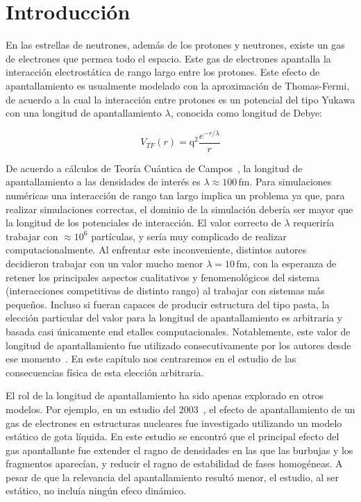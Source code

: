 \section{Introducción}

En las estrellas de neutrones, además de los protones y neutrones, existe un gas de electrones que permea todo el espacio.
Este gas de electrones apantalla la interacción electrostática de rango largo entre los protones.
Este efecto de apantallamiento es usualmente modelado con la aproximación de Thomas-Fermi, de acuerdo a la cual la interacción entre protones es un potencial del tipo Yukawa con una longitud de apantallamiento $\lambda$, conocida como longitud de Debye:

\begin{equation*}
 V_{TF}(r) = \text{q}^2\frac{e^{-r/\lambda}}{r}
\end{equation*}

De acuerdo a cálculos de Teoría Cuántica de Campos~\cite[pp. 175-180]{fetter_quantum_2003}, la longitud de apantallamiento a las densidades de interés es $\lambda\approx100\,\text{fm}$. 
Para simulaciones numéricas una interacción de rango tan largo implica un problema ya que, para realizar simulaciones correctas, el dominio de la simulación debería ser mayor que la longitud de los potenciales de interacción.
El valor correcto de $\lambda$ requeriría trabajar con $\approx 10^6$ partículas, y sería muy complicado de realizar computacionalmente.
Al enfrentar este inconveniente, distintos autores~\cite{maruyama_molecular_2012, horowitz_neutrino-pasta_2004} decidieron trabajar con un valor mucho menor $\lambda=10\,\text{fm}$, con la esperanza de retener los principales aspectos cualitativos y fenomenológicos del sistema (interacciones competitivas de distinto rango) al trabajar con sistemas más pequeños.
Incluso si fueran capaces de producir estructura del tipo pasta, la elección particular del valor para la longitud de apantallamiento es arbitraria y basada casi únicamente end etalles computacionales.
Notablemente, este valor de longitud de apantallamiento fue utilizado
consecutivamente por los autores desde ese momento~\cite{maruyama_quantum_1998, horowitz_neutrino-pasta_2004, dorso_topological_2012}.
En este capítulo nos centraremos en el estudio de las consecuencias física de esta elección arbitraria.

El rol de la longitud de apantallamiento ha sido apenas explorado en otros modelos.
Por ejemplo, en un estudio del 2003~\cite{watanabe_electron_2003}, el efecto de apantallamiento de un gas de electrones en estructuras nucleares fue investigado utilizando un modelo estático de gota líquida.
En este estudio se encontró que el principal efecto del gas apantallante fue extender el ragno de densidades en las que las burbujas y los fragmentos aparecían, y reducir el ragno de estabilidad de fases homogéneas.
A pesar de que la relevancia del apantallamiento resultó menor, el estudio, al ser estático, no incluía ningún efeco dinámico.

